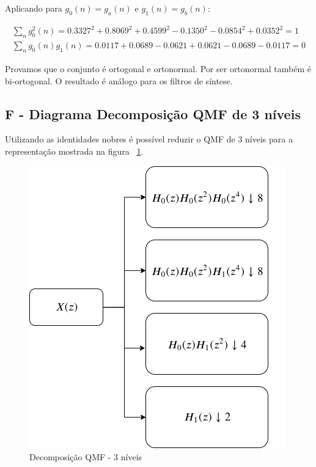 \documentclass{article}
\begin{document}
Aplicando para $g_0(n) = g_a(n)$ e $g_1(n) = g_b(n)$:

\begin{equation}
\begin{split}
\sum_{n}^{} g_0^2(n) = 0.3327^2 +    0.8069^2 +    0.4599^2   -0.1350^2   -0.0854^2 +    0.0352^2 = 1 \\
\sum_{n}^{} g_0(n)g_1(n) = 0.0117+    0.0689   -0.0621+    0.0621   -0.0689   -0.0117 = 0
\end{split}
\end{equation}

Provamos que o conjunto é ortogonal e ortonormal. Por ser ortonormal também é bi-ortogonal. O resultado é análogo para os filtros de síntese.

\newpage
\subsection*{F - Diagrama Decomposição QMF de 3 níveis}
Utilizando as identidades nobres é possível reduzir o QMF de 3 níveis para a representação mostrada na figura ~\ref{fig:Q1_dec}.

\begin{figure}[H]
	\begin{center}
		\includegraphics[scale=0.35]{Figures/dec_3.png}
		\caption{Decomposição QMF - 3 níveis}
		\label{fig:Q1_dec}
	\end{center}
\end{figure}
\end{document}
